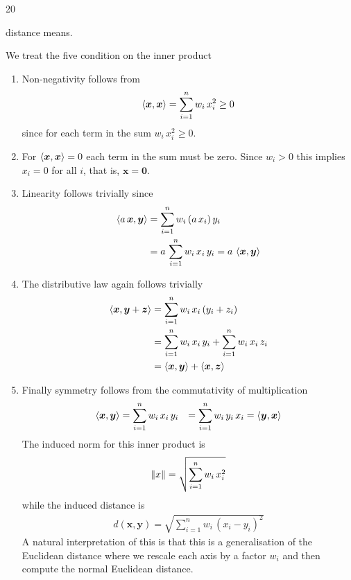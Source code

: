 \documentclass{sotonExamBoxes}    %
\begin{document}
\begin{question}{20}
\begin{qparts}
{      distance means.}{}
    \begin{answer}
      We treat the five condition on the inner product
      \begin{enumerate}
      \item Non-negativity follows from
        \begin{align*}
          \left\langle \bm{x}, \bm{x}\right\rangle = \sum_{i=1}^n w_i \, x_i ^2
          \geq 0
        \end{align*}
        since for each term in the sum $w_i \, x_i ^2\geq0$.
      \item For $ \left\langle \bm{x}, \bm{x}\right\rangle = 0$ each term in the sum
        must be zero.  Since $w_i>0$ this implies $x_i=0$ for all $i$,
        that is, $\bm{x}=\bm{0}$.
      \item Linearity follows trivially since
        \begin{align*}
          \left\langle a\,\bm{x}, \bm{y}\right\rangle
          &= \sum_{i=1}^n w_i \, (a\,x_i)  \,y_i \\
          &= a\, \sum_{i=1}^n w_i \, x_i \,y_i = a\,\left\langle \bm{x}, \bm{y}\right\rangle
        \end{align*}
      \item The distributive law again follows trivially
        \begin{align*}
          \left\langle \bm{x}, \bm{y}+\bm{z}\right\rangle
          &= \sum_{i=1}^n w_i \, x_i \,(y_i+z_i) \\
          &= \sum_{i=1}^n w_i \, x_i \,y_i + \sum_{i=1}^n w_i \, x_i \,z_i 
          \\
          &=   \left\langle \bm{x}, \bm{y}\right\rangle +   \left\langle \bm{x}, \bm{z}\right\rangle
        \end{align*}
      \item Finally symmetry follows from the commutativity of
        multiplication
        \begin{align*}
          \left\langle \bm{x}, \bm{y}\right\rangle &=  \sum_{i=1}^n w_i \, x_i \,y_i
          &=  \sum_{i=1}^n w_i \, y_i \,x_i =  \left\langle \bm{y}, \bm{x}\right\rangle 
        \end{align*}
        The induced norm for this inner product is
        \begin{align*}
          \| x \| = \sqrt{\sum_{i=1}^n w_i \, x_i^2}
        \end{align*}
        while the induced distance is
        \begin{align*}
          d(\bm{x}, \bm{y}) = \sqrt{ \sum_{i=1}^n w_i \, (x_i-y_i)^2}
        \end{align*}
        A natural interpretation of this is that this is a
        generalisation of the Euclidean distance where we rescale each
        axis by a factor $w_i$ and then compute the normal Euclidean distance.
      \end{enumerate}
    \end{answer}
  \end{qparts}
  
\end{question}




\end{document}
